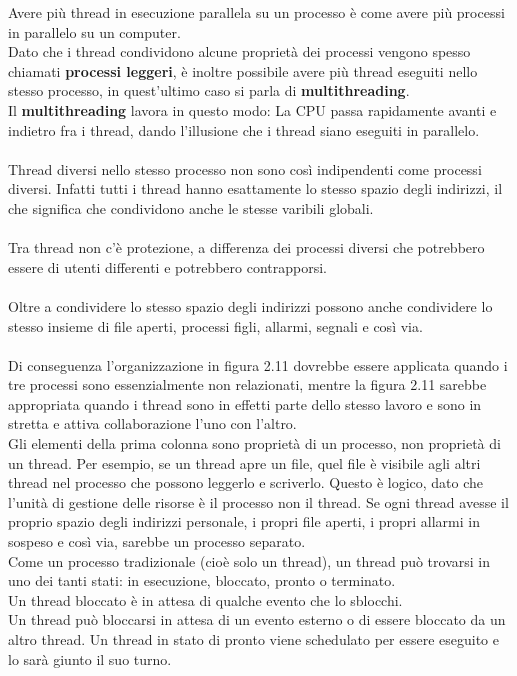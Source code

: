 \documentclass{article}
\begin{document}
Avere più thread in esecuzione parallela su un processo è come avere più processi in parallelo su un computer.
\\Dato che i thread condividono alcune proprietà dei processi vengono spesso chiamati \textbf{processi leggeri}, è inoltre possibile 
avere più thread eseguiti nello stesso processo, in quest'ultimo caso si parla di \textbf{multithreading}.
\\Il \textbf{multithreading} lavora in questo modo: La CPU passa rapidamente avanti e indietro fra i thread, dando l'illusione che i thread siano eseguiti in parallelo.
\\
\\
Thread diversi nello stesso processo non sono così indipendenti come processi diversi. Infatti tutti i thread hanno esattamente lo stesso spazio degli indirizzi, il che significa che condividono anche le stesse varibili globali.
\\
\\
Tra thread non c'è protezione, a differenza dei processi diversi che potrebbero essere di utenti differenti e potrebbero contrapporsi.
\\
\\
Oltre a condividere lo stesso spazio degli indirizzi possono anche condividere lo stesso insieme di file aperti, processi figli, allarmi, segnali e così via.
\\
\\
Di conseguenza l’organizzazione in figura 2.11 dovrebbe essere applicata quando i tre processi sono essenzialmente non relazionati, mentre la figura 2.11 sarebbe appropriata quando i thread sono in effetti parte dello stesso lavoro e sono in stretta e attiva collaborazione l’uno con l’altro.
\\Gli elementi della prima colonna sono proprietà di un processo, non proprietà di un thread. Per esempio, se un thread apre un file, quel file è visibile agli altri thread nel processo che possono leggerlo e scriverlo. Questo è logico, dato che l’unità di gestione delle risorse è il processo non il thread. Se ogni thread avesse il proprio spazio degli indirizzi personale, i propri file aperti, i propri allarmi in sospeso e così via, sarebbe un processo separato.
\\Come un processo tradizionale (cioè solo un thread), un thread può trovarsi in uno dei tanti stati: in esecuzione, bloccato, pronto o terminato. 
\\Un thread bloccato è in attesa di qualche evento che lo sblocchi. 
\\Un thread può bloccarsi in attesa di un evento esterno o di essere bloccato da un altro thread. Un thread in stato di pronto viene schedulato per essere eseguito e lo sarà giunto il suo turno.
\end{document}
